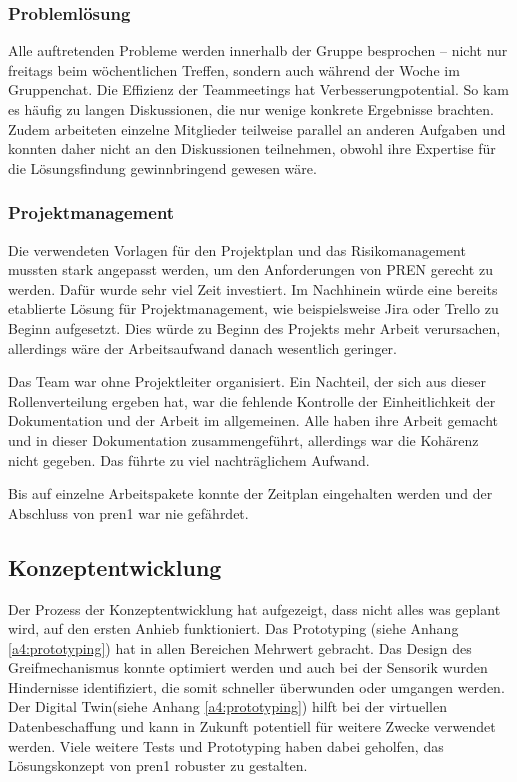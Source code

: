 \documentclass[../main.tex]{subfiles}
\begin{document}
\subsubsection{Problemlösung}
Alle auftretenden Probleme werden innerhalb der Gruppe besprochen – nicht nur freitags beim wöchentlichen Treffen, sondern auch während der Woche im Gruppenchat. Die Effizienz der Teammeetings hat Verbesserungpotential. So kam es häufig zu langen Diskussionen, die nur wenige konkrete Ergebnisse brachten. Zudem arbeiteten einzelne Mitglieder teilweise parallel an anderen Aufgaben und konnten daher nicht an den Diskussionen teilnehmen, obwohl ihre Expertise für die Lösungsfindung gewinnbringend gewesen wäre.

\subsubsection{Projektmanagement}

Die verwendeten Vorlagen für den Projektplan und das Risikomanagement mussten stark angepasst werden, um den Anforderungen von PREN gerecht zu werden. Dafür wurde sehr viel Zeit investiert. Im Nachhinein würde eine bereits etablierte Lösung für Projektmanagement, wie beispielsweise Jira oder Trello zu Beginn aufgesetzt. Dies würde zu Beginn des Projekts mehr Arbeit verursachen, allerdings wäre der Arbeitsaufwand danach wesentlich geringer.

Das Team war ohne Projektleiter organisiert. Ein Nachteil, der sich aus dieser Rollenverteilung ergeben hat, war die fehlende Kontrolle der Einheitlichkeit der Dokumentation und der Arbeit im allgemeinen. Alle haben ihre Arbeit gemacht und in dieser Dokumentation zusammengeführt, allerdings war die Kohärenz nicht gegeben. Das führte zu viel nachträglichem Aufwand.

Bis auf einzelne Arbeitspakete konnte der Zeitplan eingehalten werden und der Abschluss von \acrshort{pren1} war nie gefährdet.

\subsection{Konzeptentwicklung}

Der Prozess der Konzeptentwicklung hat aufgezeigt, dass nicht alles was geplant wird, auf den ersten Anhieb funktioniert. Das Prototyping (siehe Anhang \ref{a4:prototyping}) hat in allen Bereichen Mehrwert gebracht. Das Design des Greifmechanismus konnte optimiert werden und auch bei der Sensorik wurden Hindernisse identifiziert, die somit schneller überwunden oder umgangen werden. Der Digital Twin(siehe Anhang \ref{a4:prototyping}) hilft bei der virtuellen Datenbeschaffung und kann in Zukunft potentiell für weitere Zwecke verwendet werden. Viele weitere Tests und Prototyping haben dabei geholfen, das Lösungskonzept von \acrshort{pren1} robuster zu gestalten.
\end{document}
